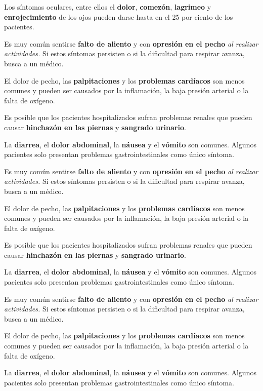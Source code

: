 Los síntomas oculares, entre ellos el \textbf{dolor}, \textbf{comezón},
\textbf{lagrimeo} y \textbf{enrojecimiento} de los ojos pueden darse
hasta en el 25 por ciento de los pacientes.

Es muy común sentirse \textbf{falto de aliento} y con \textbf{opresión
en el pecho} \emph{al realizar actividades.} Si estos síntomas persisten
o si la dificultad para respirar avanza, busca a un médico.

El dolor de pecho, las \textbf{palpitaciones} y los \textbf{problemas
cardíacos} son menos comunes y pueden ser causados por la inflamación,
la baja presión arterial o la falta de oxígeno.

Es posible que los pacientes hospitalizados sufran problemas renales que
pueden causar \textbf{hinchazón en las piernas} y \textbf{sangrado
urinario}.

La \textbf{diarrea}, el \textbf{dolor abdominal}, la \textbf{náusea} y
el \textbf{vómito} son comunes. Algunos pacientes solo presentan
problemas gastrointestinales como único síntoma.

Es muy común sentirse \textbf{falto de aliento} y con \textbf{opresión
en el pecho} \emph{al realizar actividades.} Si estos síntomas persisten
o si la dificultad para respirar avanza, busca a un médico.

El dolor de pecho, las \textbf{palpitaciones} y los \textbf{problemas
cardíacos} son menos comunes y pueden ser causados por la inflamación,
la baja presión arterial o la falta de oxígeno.

Es posible que los pacientes hospitalizados sufran problemas renales que
pueden causar \textbf{hinchazón en las piernas} y \textbf{sangrado
urinario}.

La \textbf{diarrea}, el \textbf{dolor abdominal}, la \textbf{náusea} y
el \textbf{vómito} son comunes. Algunos pacientes solo presentan
problemas gastrointestinales como único síntoma.

Es muy común sentirse \textbf{falto de aliento} y con \textbf{opresión
en el pecho} \emph{al realizar actividades.} Si estos síntomas persisten
o si la dificultad para respirar avanza, busca a un médico.

El dolor de pecho, las \textbf{palpitaciones} y los \textbf{problemas
cardíacos} son menos comunes y pueden ser causados por la inflamación,
la baja presión arterial o la falta de oxígeno.

La \textbf{diarrea}, el \textbf{dolor abdominal}, la \textbf{náusea} y
el \textbf{vómito} son comunes. Algunos pacientes solo presentan
problemas gastrointestinales como único síntoma.

